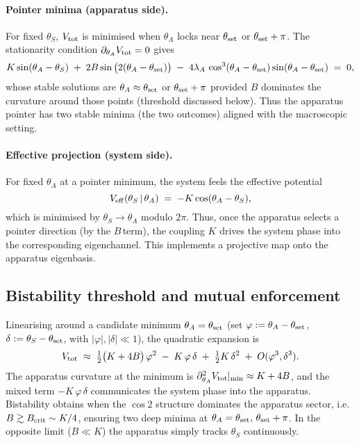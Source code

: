 \documentclass[11pt]{article}
\begin{document}
\paragraph{Pointer minima (apparatus side).} For fixed $\theta_S$, $V_{\rm tot}$ is minimised when $\theta_A$ locks near $\theta_{\rm set}$ or $\theta_{\rm set}+\pi$. The stationarity condition $\partial_{\theta_A}V_{\rm tot}=0$ gives
\begin{equation}
  K\sin(\theta_A-\theta_S) \; +\; 2B\sin\big(2(\theta_A-\theta_{\rm set})\big) \; -\; 4\lambda_A\,\cos^3(\theta_A-\theta_{\rm set})\sin(\theta_A-\theta_{\rm set}) \;=\; 0,
\end{equation}
whose stable solutions are $\theta_A\approx\theta_{\rm set}$ or $\theta_{\rm set}+\pi$ provided $B$ dominates the curvature around those points (threshold discussed below). Thus the apparatus pointer has two stable minima (the two outcomes) aligned with the macroscopic setting.

\paragraph{Effective projection (system side).} For fixed $\theta_A$ at a pointer minimum, the system feels the effective potential
\begin{equation}
  V_{\rm eff}(\theta_S\,|\,\theta_A) \;=\; -K\cos(\theta_A-\theta_S),
\end{equation}
which is minimised by $\theta_S\rightarrow\theta_A$ modulo $2\pi$. Thus, once the apparatus selects a pointer direction (by the $B$\,term), the coupling $K$ drives the system phase into the corresponding eigenchannel. This implements a projective map onto the apparatus eigenbasis.

\subsection{Bistability threshold and mutual enforcement}
Linearising around a candidate minimum $\theta_A=\theta_{\rm set}$ (set $\varphi:=\theta_A-\theta_{\rm set}$, $\delta:=\theta_S-\theta_{\rm set}$, with $|\varphi|,|\delta|\ll1$), the quadratic expansion is
\begin{equation}
  V_{\rm tot} \;\approx\; \tfrac12 \big( K+4B\big)\,\varphi^2 \; -\; K\,\varphi\,\delta \; +\; \tfrac12 K\,\delta^2 \; +\; O(\varphi^3,\delta^3) .
\end{equation}
The apparatus curvature at the minimum is $\partial^2_{\theta_A}V_{\rm tot}|_{\rm min}\approx K+4B$, and the mixed term $-K\,\varphi\,\delta$ communicates the system phase into the apparatus. Bistability obtains when the $\cos 2$ structure dominates the apparatus sector, i.e. $B\gtrsim B_{\rm crit}\sim K/4$, ensuring two deep minima at $\theta_A=\theta_{\rm set},\,\theta_{\rm set}+\pi$. In the opposite limit ($B\ll K$) the apparatus simply tracks $\theta_S$ continuously.
\end{document}

